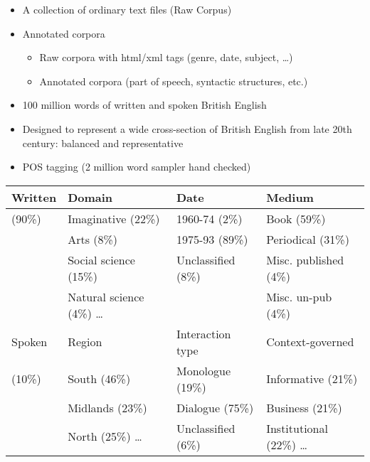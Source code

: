 \documentclass[a4paper,landscape,headrule,footrule]{foils}
\begin{document}

\begin{itemize}
\item A collection of ordinary text files (Raw Corpus)
\item Annotated corpora
  \begin{itemize}
  \item Raw corpora with html/xml tags (genre, date, subject, \ldots)
  \item Annotated corpora (part of speech, syntactic structures, etc.)
  \end{itemize}
\end{itemize}  

\begin{itemize}
\item 100 million words of written and spoken British English \citep{Burnard:2000}
\item Designed to represent a wide cross-section of British English from late 20th century: balanced and representative
\item POS tagging (2 million word sampler hand checked)
\end{itemize}
\begin{small}

  \begin{tabular}{l|lll}
    Written  & Domain  & Date & Medium \\ \hline
    (90\%)  & Imaginative (22\%) & 1960-74 (2\%) & Book (59\%) \\
    & Arts (8\%) & 1975-93 (89\%)  & Periodical (31\%)   \\
    & Social science (15\%)  & Unclassified (8\%)  & Misc. published (4\%) \\
    & Natural science (4\%) \ldots  & & Misc. un-pub (4\%)    \\  \hline
    Spoken  & Region  & Interaction type  & Context-governed \\ \hline
    (10\%)  &  South (46\%)  & Monologue (19\%)  & Informative (21\%) \\
    & Midlands (23\%)  & Dialogue (75\%)  & Business (21\%) \\
    & North (25\%)  \ldots & Unclassified (6\%)  & Institutional (22\%)  \ldots\\
  \end{tabular}
\end{small}
\end{document}
